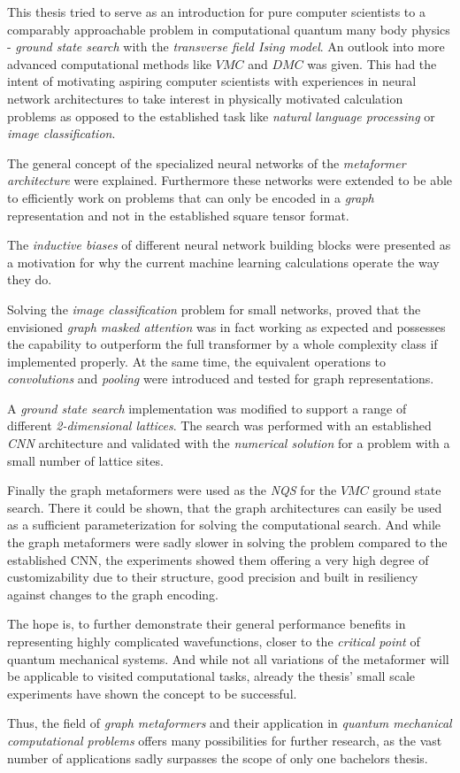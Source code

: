 This thesis tried to serve as an introduction for pure computer scientists to a comparably approachable problem in computational quantum many body physics - \emph{ground state search} with the \emph{transverse field Ising model}.
An outlook into more advanced computational methods like $VMC$ and $DMC$ was given.
This had the intent of motivating aspiring computer scientists with experiences in neural network architectures to take interest in physically motivated calculation problems as opposed to the established task like \emph{natural language processing} or \emph{image classification}.

The general concept of the specialized neural networks of the \emph{metaformer architecture} were explained.
Furthermore these networks were extended to be able to efficiently work on problems that can only be encoded in a \emph{graph} representation and not in the established square tensor format.

The \emph{inductive biases} of different neural network building blocks were presented as a motivation for why the current machine learning calculations operate the way they do.

Solving the \emph{image classification} problem for small networks, proved that the envisioned \emph{graph masked attention} was in fact working as expected and possesses the capability to outperform the full transformer by a whole complexity class if implemented properly.
At the same time, the equivalent operations to \emph{convolutions} and \emph{pooling} were introduced and tested for graph representations.

A \emph{ground state search} implementation was modified to support a range of different \emph{2-dimensional lattices}.
The search was performed with an established \emph{CNN} architecture and validated with the \emph{numerical solution} for a problem with a small number of lattice sites.

Finally the graph metaformers were used as the \emph{NQS} for the $VMC$ ground state search.
There it could be shown, that the graph architectures can easily be used as a sufficient parameterization for solving the computational search.
And while the graph metaformers were sadly slower in solving the problem compared to the established CNN, the experiments showed them offering a very high degree of customizability due to their structure, good precision and built in resiliency against changes to the graph encoding.

The hope is, to further demonstrate their general performance benefits in representing highly complicated wavefunctions, closer to the \emph{critical point} of quantum mechanical systems.  %
And while not all variations of the metaformer will be applicable to visited computational tasks, already the thesis' small scale experiments have shown the concept to be successful.

Thus, the field of \emph{graph metaformers} and their application in \emph{quantum mechanical computational problems} offers many possibilities for further research, as the vast number of applications sadly surpasses the scope of only one bachelors thesis.
